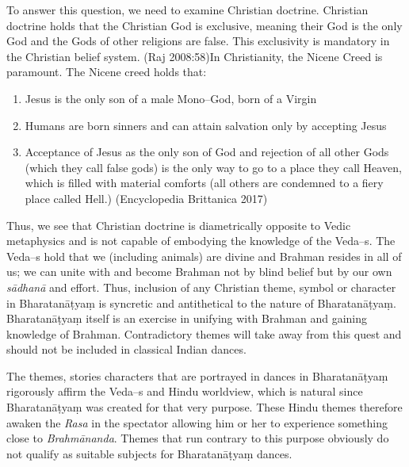 \vskip 2pt

To answer this question, we need to examine Christian doctrine. Christian doctrine holds that the Christian God is exclusive, meaning their God is the only God and the Gods of other religions are false. This exclusivity is mandatory in the Christian belief system. (Raj 2008:58)In Christianity, the Nicene Creed is paramount. The Nicene creed holds that:

\begin{enumerate}[{\rm 1)}]
\itemsep=0pt
\item Jesus is the only son of a male Mono–God, born of a Virgin 

 \item Humans are born sinners and can attain salvation only by accepting Jesus

 \item Acceptance of Jesus as the only son of God and rejection of all other Gods (which they call false gods) is the only way to go to a place they call Heaven, which is filled with material comforts (all others are condemned to a fiery place called Hell.) (Encyclopedia Brittanica 2017)

\end{enumerate}

Thus, we see that Christian doctrine is diametrically opposite to Vedic metaphysics and is not capable of embodying the knowledge of the Veda–s. The Veda–s hold that we (including animals) are divine and Brahman resides in all of us; we can unite with and become Brahman not by blind belief but by our own \textit{sādhanā} and effort. Thus, inclusion of any Christian theme, symbol or character in Bharatanāṭyaṃ is syncretic and antithetical to the nature of Bharatanāṭyaṃ. Bharatanāṭyaṃ itself is an exercise in unifying with Brahman and gaining knowledge of Brahman. Contradictory themes will take away from this quest and should not be included in classical Indian dances.

The themes, stories characters that are portrayed in dances in Bharatanāṭyaṃ rigorously affirm the Veda–s and Hindu worldview, which is natural since Bharatanāṭyaṃ was created for that very purpose. These Hindu themes therefore awaken the \textit{Rasa} in the spectator allowing him or her to experience something close to \textit{Brahmānanda}. Themes that run contrary to this purpose obviously do not qualify as suitable subjects for Bharatanāṭyaṃ dances.

